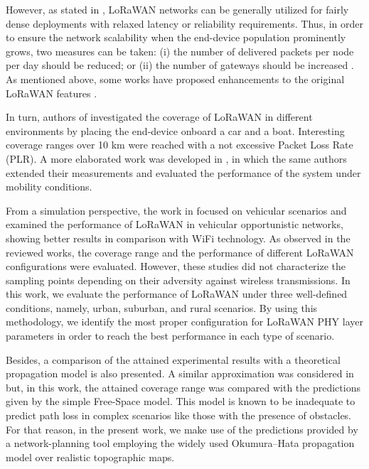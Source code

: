 However,
	as stated in \cite{mikhaylov_analysis_2016},
	LoRaWAN networks can be generally utilized for fairly dense deployments with relaxed latency or reliability requirements.
Thus,
	in order to ensure the network scalability when the end-device population prominently grows,
	two measures can be taken:
	(i) the number of delivered packets per node per day should be reduced;
	or (ii) the number of gateways should be increased \cite{bankov_limits_2016}.
As mentioned above,
	some works have proposed enhancements to the original LoRaWAN features \cite{naoui_enhancing_2016}\cite{weber_ipv6_2016}.





In turn,
	authors of \cite{petajajarvi_coverage_2015} investigated the coverage of LoRaWAN in different environments by placing the end-device onboard a car and a boat.
Interesting coverage ranges over 10 km were reached with a not excessive Packet Loss Rate (PLR).
A more elaborated work was developed in \cite{petajajarvi_performance_2017},
	in which the same authors extended their measurements and evaluated the performance of the system under mobility conditions.

From a simulation perspective,
	the work in \cite{herrera-tapia_evaluating_2017} focused on vehicular scenarios and examined the performance of LoRaWAN in vehicular opportunistic networks,
	showing better results in comparison with WiFi technology.
As observed in the reviewed works,
	the coverage range and the performance of different LoRaWAN configurations were evaluated.
However,
	these studies did not characterize the sampling points depending on their adversity against wireless transmissions.
In this work,
	we evaluate the performance of LoRaWAN under three well-defined conditions,
	namely,
	urban,
	suburban,
	and rural scenarios.
By using this methodology,
	we identify the most proper configuration for LoRaWAN PHY layer parameters in order to reach the best performance in each type of scenario.

Besides,
	a comparison of the attained experimental results with a theoretical propagation model is also presented.
A similar approximation was considered in \cite{petajajarvi_coverage_2015} but,
	in this work,
	the attained coverage range was compared with the predictions given by the simple Free-Space model.
This model is known to be inadequate to predict path loss in complex scenarios like those with the presence of obstacles.
For that reason,
	in the present work,
	we make use of the predictions provided by a network-planning tool employing the widely used Okumura–Hata propagation model over realistic topographic maps.

